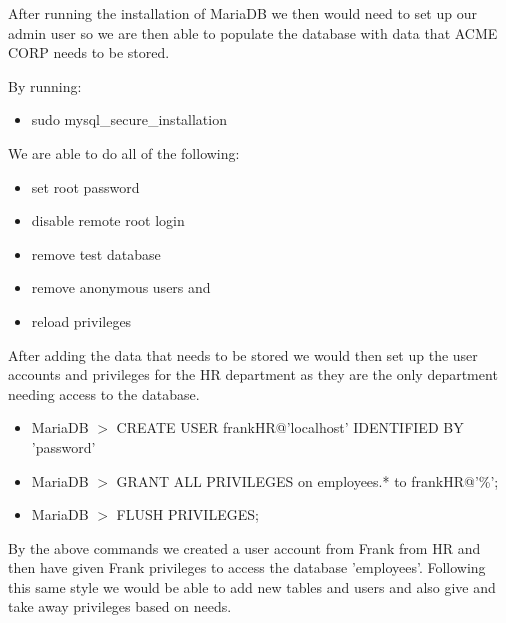 \noindent After running the installation of MariaDB we then would need to set 
up our admin user so we are then able to populate the database with data that 
ACME CORP needs to be stored. 

\noindent By running:

\begin{itemize}
\item sudo mysql\_secure\_installation \\
\end{itemize}

\noindent We are able to do all of the following: 

\begin{itemize}
\item set root password
\item disable remote root login
\item remove test database
\item remove anonymous users and
\item reload privileges
\end{itemize}

\noindent After adding the data that needs to be stored we would then set up 
the user accounts and privileges for the HR department as they are the only 
department needing access to the database.

\begin{itemize}

\item MariaDB $>$ CREATE USER frankHR@'localhost' IDENTIFIED BY 'password'

\item MariaDB $>$ GRANT ALL PRIVILEGES on employees.* to frankHR@'\%';

\item MariaDB $>$ FLUSH PRIVILEGES; 

\end{itemize}

\noindent By the above commands we created a user account from Frank from HR 
and then have given Frank privileges to access the database 'employees'. 
Following this same style we would be able to add new tables and users and also
 give and take away privileges based on needs.





